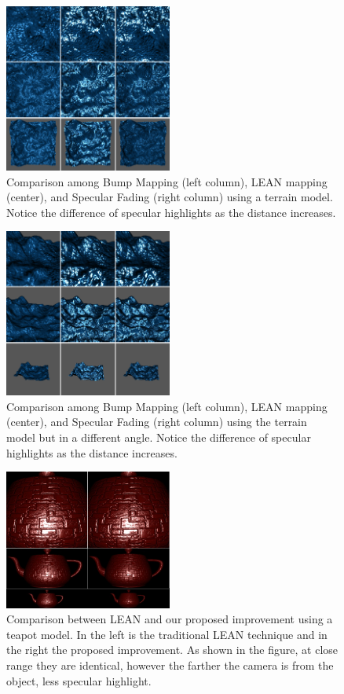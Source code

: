 \documentclass[10pt, conference]{IEEEtran}
\begin{document}
\begin{figure}[here]
\includegraphics[width=0.49\textwidth]{figs/BLS6.png}
\caption{Comparison among Bump Mapping (left column), LEAN mapping (center), and Specular Fading (right column) using a terrain model. Notice the difference of specular highlights as the distance increases.}
\label{fig:BLS6}
\end{figure}

\begin{figure}[here]
\includegraphics[width=0.49\textwidth]{figs/BLS7.png}
\caption{Comparison among Bump Mapping (left column), LEAN mapping (center), and Specular Fading (right column) using the terrain model but in a different angle. Notice the difference of specular highlights as the distance increases.}
\label{fig:BLS7}
\end{figure}

\begin{figure}[here]
\includegraphics[width=0.49\textwidth]{figs/LS1.png}
\caption{Comparison between LEAN and our proposed improvement using a teapot model. In the left is the traditional LEAN technique and in the right the proposed improvement. As shown in the figure, at close range they are identical, however the farther the camera is from the object, less specular highlight.}
\label{fig:LS1}
\end{figure}
\end{document}
